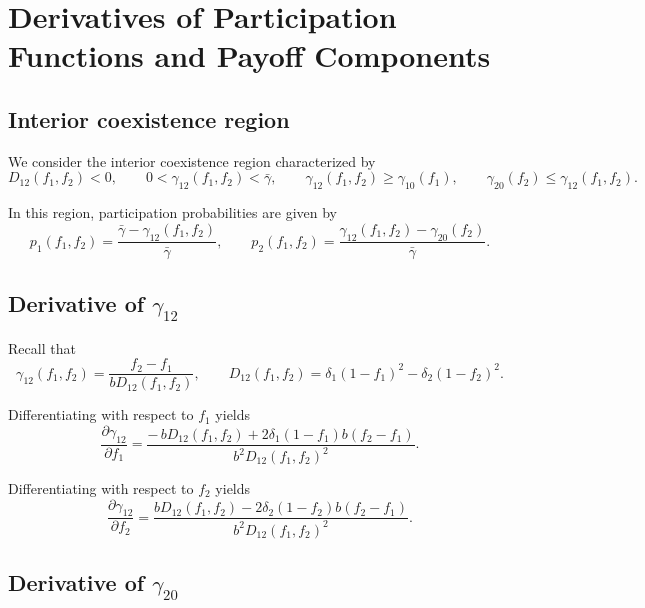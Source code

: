 \documentclass[10pt]{article}
\begin{document}
\appendix
\appendix

\section{Derivatives of Participation Functions and Payoff Components}\label{appendix:derivatives}

\subsection{Interior coexistence region}

We consider the interior coexistence region characterized by
\[
D_{12}(f_1,f_2)<0,
\qquad
0<\gamma_{12}(f_1,f_2)<\bar{\gamma},
\qquad
\gamma_{12}(f_1,f_2)\ge \gamma_{10}(f_1),
\qquad
\gamma_{20}(f_2)\le \gamma_{12}(f_1,f_2).
\]

In this region, participation probabilities are given by
\begin{equation}
p_1(f_1,f_2)=\frac{\bar{\gamma}-\gamma_{12}(f_1,f_2)}{\bar{\gamma}},
\qquad
p_2(f_1,f_2)=\frac{\gamma_{12}(f_1,f_2)-\gamma_{20}(f_2)}{\bar{\gamma}}.
\end{equation}

\subsection{Derivative of $\gamma_{12}$}

Recall that
\begin{equation}
\gamma_{12}(f_1,f_2)
=
\frac{f_2-f_1}{bD_{12}(f_1,f_2)},
\qquad
D_{12}(f_1,f_2)=\delta_1(1-f_1)^2-\delta_2(1-f_2)^2.
\end{equation}

Differentiating with respect to $f_1$ yields
\begin{equation}
\frac{\partial \gamma_{12}}{\partial f_1}
=
\frac{
-\,bD_{12}(f_1,f_2)
+
2\delta_1(1-f_1)b(f_2-f_1)
}{
b^2D_{12}(f_1,f_2)^2
}.
\end{equation}

Differentiating with respect to $f_2$ yields
\begin{equation}
\frac{\partial \gamma_{12}}{\partial f_2}
=
\frac{
bD_{12}(f_1,f_2)
-
2\delta_2(1-f_2)b(f_2-f_1)
}{
b^2D_{12}(f_1,f_2)^2
}.
\end{equation}

\subsection{Derivative of $\gamma_{20}$}
\end{document}
